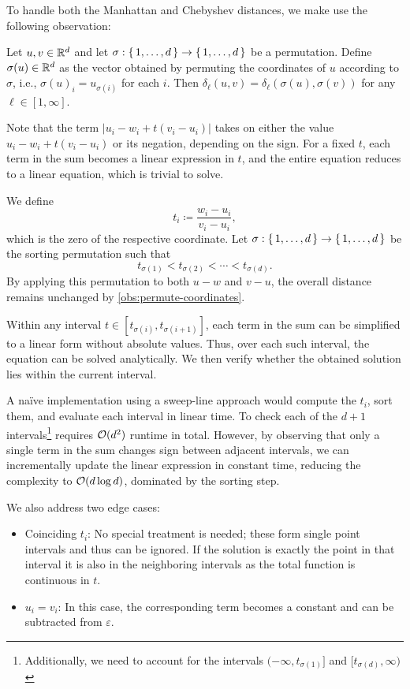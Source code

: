 To handle both the Manhattan and Chebyshev distances, we make use the following observation: 
\begin{observation}\label{obs:permute-coordinates}
  Let \(u, v \in \mathbb{R}^d\) and let \(\sigma: \set{1, \dots, d} \to \set{1, \dots, d}\) be a permutation. Define \(\sigma(u) \in \mathbb{R}^d\) as the vector obtained by permuting the coordinates of \(u\) according to \(\sigma\), i.e., \(\sigma(u)_i = u_{\sigma(i)}\) for each \(i\). Then \(\delta_\ell(u, v) = \delta_\ell(\sigma(u), \sigma(v))\) for any \(\ell \in [1, \infty]\).
\end{observation}

Note that the term \(|u_i - w_i + t (v_i - u_i )|\) takes on either the value \(u_i - w_i + t(v_i - u_i)\) or its negation, depending on the sign. For a fixed \(t\), each term in the sum becomes a linear expression in \(t\), and the entire equation reduces to a linear equation, which is trivial to solve. 

We define 
  \[t_i \coloneq \frac{w_i - u_i}{v_i - u_i},\]
which is the zero of the respective coordinate. Let \(\sigma:\set{1,\dots, d} \to \set{1,\dots, d}\) be the sorting permutation such that 
  \[t_{\sigma(1)} < t_{\sigma(2)} < \cdots < t_{\sigma(d)}.\] 
By applying this permutation to both \(u-w\) and \(v -u\), the overall distance remains unchanged by \cref{obs:permute-coordinates}. 

Within any interval \(t \in [t_{\sigma(i)}, t_{\sigma(i+1)}]\), each term in the sum can be simplified to a linear form without absolute values. Thus, over each such interval, the equation can be solved analytically. We then verify whether the obtained solution lies within the current interval. 

A na\"ive implementation using a sweep-line approach would compute the \(t_i\), sort them, and evaluate each interval in linear time. To check each of the \(d+1\) intervals\footnote{Additionally, we need to account for the intervals \((-\infty, t_{\sigma(1)}]\) and \([t_{\sigma(d)}, \infty)\)} requires \(\mathcal{O}(d^2)\) runtime in total. However, by observing that only a single term in the sum changes sign between adjacent intervals, we can incrementally update the linear expression in constant time, reducing the complexity to \(\mathcal{O}(d \log d)\), dominated by the sorting step. 

We also address two edge cases:
\begin{itemize}
	\item Coinciding \(t_i\): No special treatment is needed; these form single point intervals and thus can be ignored. If the solution is exactly the point in that interval it is also in the neighboring intervals as the total function is continuous in \(t\).
	\item \(u_i = v_i\): In this case, the corresponding term becomes a constant and can be subtracted from \(\varepsilon\).
\end{itemize}

